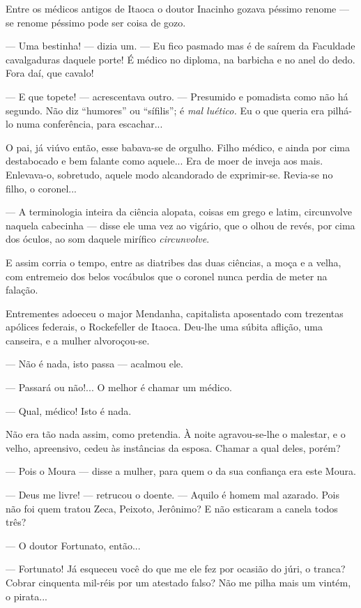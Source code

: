 Entre os médicos antigos de Itaoca o doutor Inacinho gozava péssimo
renome --- se renome péssimo pode ser coisa de gozo.

--- Uma bestinha! --- dizia um. --- Eu fico pasmado mas é de saírem da
Faculdade cavalgaduras daquele porte! É médico no diploma, na barbicha e
no anel do dedo. Fora daí, que cavalo!

--- E que topete! --- acrescentava outro. --- Presumido e pomadista como
não há segundo. Não diz ``humores'' ou ``sífilis''; é \emph{mal
luético.} Eu o que queria era pilhá-lo numa conferência, para
escachar...

O pai, já viúvo então, esse babava-se de orgulho. Filho médico, e ainda
por cima destabocado e bem falante como aquele... Era de moer de inveja
aos mais. Enlevava-o, sobretudo, aquele modo alcandorado de exprimir-se.
Revia-se no filho, o coronel...

--- A terminologia inteira da ciência alopata, coisas em grego e latim,
circunvolve naquela cabecinha --- disse ele uma vez ao vigário, que o
olhou de revés, por cima dos óculos, ao som daquele mirífico
\emph{circunvolve}.

E assim corria o tempo, entre as diatribes das duas ciências, a moça e a
velha, com entremeio dos belos vocábulos que o coronel nunca perdia de
meter na falação.

Entrementes adoeceu o major Mendanha, capitalista aposentado com
trezentas apólices federais, o Rockefeller de Itaoca. Deu-lhe uma súbita
aflição, uma canseira, e a mulher alvoroçou-se.

--- Não é nada, isto passa --- acalmou ele.

--- Passará ou não!... O melhor é chamar um médico.

--- Qual, médico! Isto é nada.

Não era tão nada assim, como pretendia. À noite agravou-se-lhe o
malestar, e o velho, apreensivo, cedeu às instâncias da esposa. Chamar a
qual deles, porém?

--- Pois o Moura --- disse a mulher, para quem o da sua confiança era
este Moura.

--- Deus me livre! --- retrucou o doente. --- Aquilo é homem mal
azarado. Pois não foi quem tratou Zeca, Peixoto, Jerônimo? E não
esticaram a canela todos três?

--- O doutor Fortunato, então...

--- Fortunato! Já esqueceu você do que me ele fez por ocasião do júri, o
tranca? Cobrar cinquenta mil-réis por um atestado falso? Não me pilha
mais um vintém, o pirata...

